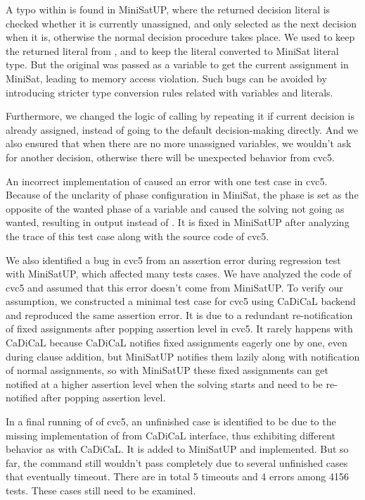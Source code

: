 A typo within  is found in MiniSatUP, where the returned decision literal is checked whether it is currently unassigned, and only selected as the next decision when it is, otherwise the normal decision procedure takes place. We used  to keep the returned literal from , and  to keep the literal converted to MiniSat literal type. But the original  was passed as a variable to get the current assignment in MiniSat, leading to memory access violation. Such bugs can be avoided by introducing stricter type conversion rules related with variables and literals.

Furthermore, we changed the logic of calling  by repeating it if current decision is already assigned, instead of going to the default decision-making directly. And we also ensured that when there are no more unassigned variables, we wouldn't ask for another decision, otherwise there will be unexpected behavior from cvc5.

An incorrect implementation of  caused an error with one test case in cvc5. Because of the unclarity of phase configuration in MiniSat, the phase is set as the opposite of the wanted phase of a variable and caused the solving not going as wanted, resulting in  output instead of . It is fixed in MiniSatUP after analyzing the trace of this test case along with the source code of cvc5.

We also identified a bug in cvc5 from an assertion error during regression test with MiniSatUP, which affected many tests cases. We have analyzed the code of cvc5 and assumed that this error doesn't come from MiniSatUP. To verify our assumption, we constructed a minimal test case for cvc5 using CaDiCaL backend and reproduced the same assertion error. It is due to a redundant re-notification of fixed assignments after popping assertion level in cvc5. It rarely happens with CaDiCaL because CaDiCaL notifies fixed assignments eagerly one by one, even during clause addition, but MiniSatUP notifies them lazily along with notification of normal assignments, so with MiniSatUP these fixed assignments can get notified at a higher assertion level when the solving starts and need to be re-notified after popping assertion level.

In a final running of  of cvc5, an unfinished case is identified to be due to the missing implementation of  from CaDiCaL interface, thus exhibiting different behavior as with CaDiCaL. It is added to MiniSatUP and implemented. But so far, the  command still wouldn't pass completely due to several unfinished cases that eventually timeout. There are in total 5 timeouts and 4 errors among 4156 tests. These cases still need to be examined.

